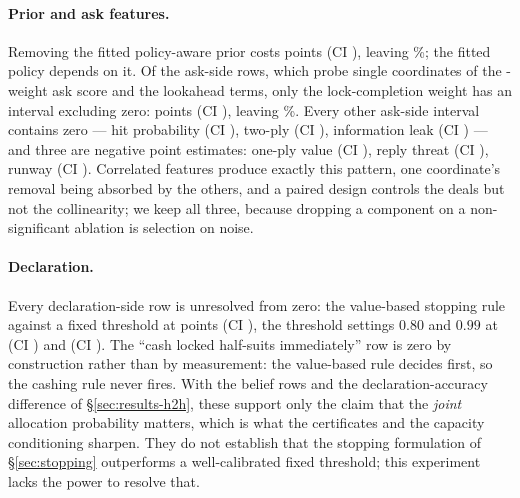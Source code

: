 \paragraph{Prior and ask features.}
Removing the fitted policy-aware prior costs \numAblPrior{} points (CI
\numAblPriorCI{}), leaving \numAblPriorAbs\%; the fitted policy depends on it. Of
the ask-side rows, which probe single coordinates of the \numAskFeats-weight ask
score and the lookahead terms, only the lock-completion weight has an interval
excluding zero: \numAblLockWeight{} points (CI \numAblLockWeightCI{}), leaving
\numAblLockWeightAbs\%. Every other ask-side interval contains zero --- hit
probability \numAblHitWeight{} (CI \numAblHitWeightCI{}), two-ply
\numAblTwoPly{} (CI \numAblTwoPlyCI{}), information leak \numAblLeak{} (CI
\numAblLeakCI{}) --- and three are negative point estimates: one-ply value
\numAblValue{} (CI \numAblValueCI{}), reply threat \numAblThreat{} (CI
\numAblThreatCI{}), runway \numAblRunway{} (CI \numAblRunwayCI{}). Correlated
features produce exactly this pattern, one coordinate's removal being absorbed by
the others, and a paired design controls the deals but not the collinearity; we
keep all three, because dropping a component on a non-significant ablation is
selection on noise.

\paragraph{Declaration.}
Every declaration-side row is unresolved from zero: the value-based stopping rule
against a fixed threshold at \numAblStop{} points (CI \numAblStopCI{}), the
threshold settings $0.80$ and $0.99$ at \numAblDeclEighty{} (CI
\numAblDeclEightyCI{}) and \numAblDeclNinetyNine{} (CI \numAblDeclNinetyNineCI{}).
The ``cash locked half-suits immediately'' row is zero by construction rather than
by measurement: the value-based rule decides first, so the cashing rule never
fires. With the belief rows and the declaration-accuracy difference of
\S\ref{sec:results-h2h}, these support only the claim that the \emph{joint}
allocation probability matters, which is what the certificates and the capacity
conditioning sharpen. They do not establish that the stopping formulation of
\S\ref{sec:stopping} outperforms a well-calibrated fixed threshold; this
experiment lacks the power to resolve that.

